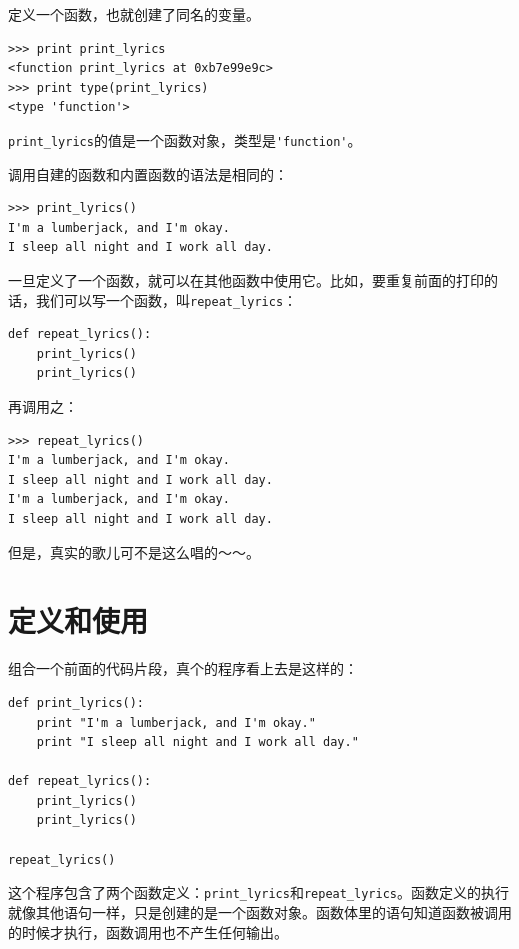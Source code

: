 定义一个函数，也就创建了同名的变量。

\beforeverb
\begin{verbatim}
>>> print print_lyrics
<function print_lyrics at 0xb7e99e9c>
>>> print type(print_lyrics)
<type 'function'>
\end{verbatim}
\afterverb

\verb"print_lyrics"的值是一个函数对象，类型是\verb"'function'"。


调用自建的函数和内置函数的语法是相同的：

\beforeverb
\begin{verbatim}
>>> print_lyrics()
I'm a lumberjack, and I'm okay.
I sleep all night and I work all day.
\end{verbatim}
\afterverb

一旦定义了一个函数，就可以在其他函数中使用它。比如，要重复前面的打印的话，我们可以写一个函数，叫\verb"repeat_lyrics"：

\beforeverb
\begin{verbatim}
def repeat_lyrics():
    print_lyrics()
    print_lyrics()
\end{verbatim}
\afterverb

 再调用之：

 \beforeverb
\begin{verbatim}
>>> repeat_lyrics()
I'm a lumberjack, and I'm okay.
I sleep all night and I work all day.
I'm a lumberjack, and I'm okay.
I sleep all night and I work all day.
\end{verbatim}
\afterverb

但是，真实的歌儿可不是这么唱的～～。


\section{定义和使用}

组合一个前面的代码片段，真个的程序看上去是这样的：

\beforeverb
\begin{verbatim}
def print_lyrics():
    print "I'm a lumberjack, and I'm okay."
    print "I sleep all night and I work all day."

def repeat_lyrics():
    print_lyrics()
    print_lyrics()

repeat_lyrics()
\end{verbatim}
\afterverb

这个程序包含了两个函数定义：\verb"print_lyrics"和\verb"repeat_lyrics"。函数定义的执行就像其他语句一样，只是创建的是一个函数对象。函数体里的语句知道函数被调用的时候才执行，函数调用也不产生任何输出。

